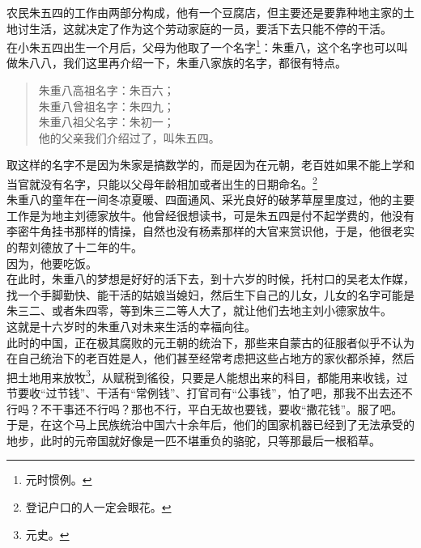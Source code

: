 \begin{multicols}{\theparacolNo}
农民朱五四的工作由两部分构成，他有一个豆腐店，但主要还是要靠种地主家的土地讨生活，这就决定了作为这个劳动家庭的一员，要活下去只能不停的干活。\\

在小朱五四出生一个月后，父母为他取了一个名字\footnote{元时惯例。}：朱重八，这个名字也可以叫做朱八八，我们这里再介绍一下，朱重八家族的名字，都很有特点。\\

{\footnotesize \begin{quote}
	朱重八高祖名字：朱百六；\\
	朱重八曾祖名字：朱四九；\\
	朱重八祖父名字：朱初一；\\
	他的父亲我们介绍过了，叫朱五四。\\
\end{quote}}

取这样的名字不是因为朱家是搞数学的，而是因为在元朝，老百姓如果不能上学和当官就没有名字，只能以父母年龄相加或者出生的日期命名。\footnote{登记户口的人一定会眼花。}\\

朱重八的童年在一间冬凉夏暖、四面通风、采光良好的破茅草屋里度过，他的主要工作是为地主刘德家放牛。他曾经很想读书，可是朱五四是付不起学费的，他没有李密牛角挂书那样的情操，自然也没有杨素那样的大官来赏识他，于是，他很老实的帮刘德放了十二年的牛。\\

因为，他要吃饭。\\

在此时，朱重八的梦想是好好的活下去，到十六岁的时候，托村口的吴老太作媒，找一个手脚勤快、能干活的姑娘当媳妇，然后生下自己的儿女，儿女的名字可能是朱三二、或者朱四零，等到朱三二等人大了，就让他们去地主刘小德家放牛。\\

这就是十六岁时的朱重八对未来生活的幸福向往。\\

此时的中国，正在极其腐败的元王朝的统治下，那些来自蒙古的征服者似乎不认为在自己统治下的老百姓是人，他们甚至经常考虑把这些占地方的家伙都杀掉，然后把土地用来放牧\footnote{元史。}，从赋税到徭役，只要是人能想出来的科目，都能用来收钱，过节要收“过节钱”、干活有“常例钱”、打官司有“公事钱”，怕了吧，那我不出去还不行吗？不干事还不行吗？那也不行，平白无故也要钱，要收“撒花钱”。服了吧。\\

于是，在这个马上民族统治中国六十余年后，他们的国家机器已经到了无法承受的地步，此时的元帝国就好像是一匹不堪重负的骆驼，只等那最后一根稻草。\\


\end{multicols}
